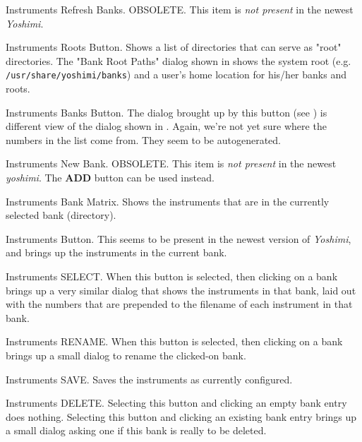    Instruments Refresh Banks.  OBSOLETE.
   This item is \textsl{not present} in the newest \textsl{Yoshimi}.

   Instruments Roots Button.
   Shows a list of directories that can serve as "root" directories.
   The "Bank Root Paths" dialog shown in
    shows
   the system root (e.g. \texttt{/usr/share/yoshimi/banks}) and
   a user's home location for his/her banks and roots.

   Instruments Banks Button.
   The dialog brought up by this button
   (see )
   is different view of the dialog shown in
   .
   Again, we're not yet sure where the numbers in the list come from.
   They seem to be autogenerated.

   Instruments New Bank. OBSOLETE.
   This item is \textsl{not present} in the newest \textsl{yoshimi}.
   The \textbf{ADD} button can be used instead.

   Instruments Bank Matrix.
   Shows the instruments that are in the currently selected bank
   (directory).

   Instruments Button.
   This seems to be present in the newest version of 
   \textsl{Yoshimi}, and brings up the instruments in the current bank.

   Instruments SELECT.
   When this button is selected, then clicking on a bank brings
   up a very similar dialog that shows the instruments in that bank, laid
   out with the numbers that are prepended to the filename of each
   instrument in that bank.

   Instruments RENAME.
   When this button is selected, then clicking on a bank brings
   up a small dialog to rename the clicked-on bank.

   Instruments SAVE.
   Saves the instruments as currently configured.

   Instruments DELETE.
   Selecting this button and clicking an empty bank entry does nothing.
   Selecting this button and clicking an existing bank entry brings up a
   small dialog asking one if this bank is really to be deleted.

